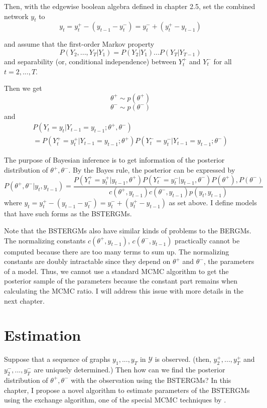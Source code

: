 \documentclass[a4paper, 11pt]{report}
\theoremstyle{definition}
\begin{document}
Then, with the edgewise boolean algebra defined in chapter 2.5, set the combined network $y_t$ to
\[y_t=y_t^+ - (y_{t-1} - y_t^-) = y_t^- + (y_t^+ - y_{t-1})\]

and assume that the first-order Markov property
\[P(Y_2,...,Y_T|Y_1)=P(Y_2|Y_1)...P(Y_T|Y_{T-1})\]
and separability (or, conditional independence) between $Y_t^+$ and $Y_t^-$ for all $t=2,...,T$.

Then we get
\[\theta^+ \sim p(\theta^+)\]
\[\theta^- \sim p(\theta^-)\]
and
\begin{multline}
    P(Y_t=y_t|Y_{t-1}=y_{t-1};\theta^+,\theta^-) \\ 
    =P(Y_t^+=y_t^+|Y_{t-1}=y_{t-1};\theta^+) P(Y_t^-=y_t^-|Y_{t-1}=y_{t-1};\theta^-)
\end{multline}

The purpose of Bayesian inference is to get information of the posterior distribution of $\theta^+,\theta^-$.
By the Bayes rule, the posterior can be expressed by
\[P(\theta^+,\theta^-|y_t, y_{t-1}) = \frac{P(Y_t^+=y_t^+|y_{t-1},\theta^+) P(Y_t^-=y_t^-|y_{t-1},\theta^-)P(\theta^+),P(\theta^-)}{c(\theta^+,y_{t-1})c(\theta^-,y_{t-1})p(y_t, y_{t-1})} \]
where $y_t=y_t^+ - (y_{t-1} - y_t^-) = y_t^- + (y_t^+ - y_{t-1})$ as set above.
I define models that have such forms as the BSTERGMs.

Note that the BSTERGMs also have similar kinds of problems to the BERGMs.
The normalizing constants $c(\theta^+,y_{t-1})$, $c(\theta^-,y_{t-1})$ practically cannot be computed 
because there are too many terms to sum up.
The normalizing constants are doubly intractable since they depend on $\theta^+$ and $\theta^-$, the parameters of a model.
Thus, we cannot use a standard MCMC algorithm to get the posterior sample of the parameters
because the constant part remains when calculating the MCMC ratio.
I will address this issue with more details in the next chapter.


\chapter{Estimation} \label{Chapter4}

Suppose that a sequence of graphs $y_1,...,y_T$ in $\mathcal{Y}$ is observed.
(then, $y_2^+,...,y_T^+$ and $y_2^-,...,y_T^-$ are uniquely determined.) 
Then how can we find the posterior distribution of $\theta^+,\theta^-$ with the observation using the BSTERGMs?
In this chapter, I propose a novel algorithm to estimate parameters of the BSTERGMs using the exchange algorithm, 
one of the special MCMC techniques by \cite{RN127}.
\end{document}
